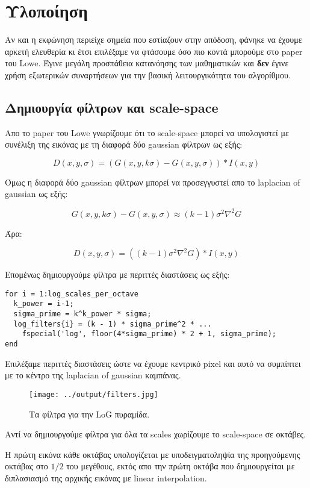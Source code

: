 \documentclass[11pt]{scrartcl} %
\begin{document}
\section{Υλοποίηση}
Αν και η εκφώνηση περιείχε σημεία που εστίαζουν στην απόδοση, φάνηκε να έχουμε αρκετή ελευθερία κι έτσι επιλέξαμε
να φτάσουμε όσο πιο κοντά μπορούμε στο paper του Lowe. Έγινε μεγάλη προσπάθεια κατανόησης των μαθηματικών και \textbf{δεν}
έγινε χρήση εξωτερικών συναρτήσεων για την βασική λειτουργικότητα του αλγορίθμου.

\subsection{Δημιουργία φίλτρων και scale-space}

Απο το paper του Lowe γνωρίζουμε ότι το scale-space μπορεί να υπολογιστεί με συνέλιξη της εικόνας με τη διαφορά δύο gaussian φίλτρων ως εξής:

\[D(x,y,\sigma) = (G(x,y,k\sigma) − G(x,y,\sigma)) * I(x,y)\]

Όμως η διαφορά δύο gaussian φίλτρων μπορεί να προσεγγυστεί απο το laplacian of gaussian ως εξής:

\[G(x,y,k\sigma) − G(x,y,\sigma) \approx (k−1)\sigma^2 \nabla^2 G\]

Άρα:

\[D(x,y,\sigma) = ((k−1)\sigma^2 \nabla^2 G) * I(x,y)\]

Επομένως δημιουργούμε φίλτρα με περιττές διαστάσεις ως εξής:

\begin{verbatim}
for i = 1:log_scales_per_octave
  k_power = i-1;
  sigma_prime = k^k_power * sigma;
  log_filters{i} = (k - 1) * sigma_prime^2 * ...
    fspecial('log', floor(4*sigma_prime) * 2 + 1, sigma_prime);
end
\end{verbatim}

Επιλέξαμε περιττές διαστάσεις ώστε να έχουμε κεντρικό pixel και αυτό να συμπίπτει με το κέντρο της laplacian of gaussian καμπάνας.

\begin{figure}[H]
  \centerline{\texttt{[image: ../output/filters.jpg]}}
  \caption{Τα φίλτρα για την LoG πυραμίδα.}
\end{figure}

Αντί να δημιουργούμε φίλτρα για όλα τα scales χωρίζουμε το scale-space σε οκτάβες.

Η πρώτη εικόνα κάθε οκτάβας υπολογίζεται με υποδειγματοληψία της προηγούμενης οκτάβας στο $1/2$ του μεγέθους, εκτός απο την πρώτη οκτάβα που δημιουργείται με διπλασιασμό της αρχικής εικόνας με linear interpolation.
\end{document}
